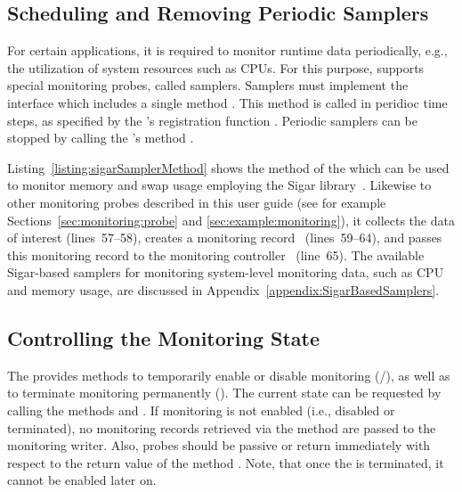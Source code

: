 \subsection{Scheduling and Removing Periodic Samplers}\label{sec:componentsMonitoring:monitoringController:periodicSamplers}

For certain applications, it is required to monitor runtime data periodically, %
e.g., the utilization of system resources such as CPUs. %
For this purpose, \Kieker{} supports special monitoring probes, called samplers. %
Samplers must implement the interface  which includes a %
single method . %
This method is called in peridioc time steps, %
as specified by the 's registration function %
. Periodic samplers can be stopped by %
calling the 's method .

Listing~\ref{listing:sigarSamplerMethod} shows the  method %
of the  which can be used to monitor memory %
and swap usage employing the Sigar library~\cite{HypericSigarWebsite}. %
Likewise to other monitoring probes described in this user guide (see for %
example Sections~\ref{sec:monitoring:probe} and \ref{sec:example:monitoring}), 
it collects the data of interest (lines~57--58), creates a monitoring record~%
(lines~59--64), and passes this monitoring record to the monitoring controller~%
(line~65). %
The available Sigar-based samplers for monitoring system-level monitoring %
data, such as CPU and memory usage, are discussed in Appendix~\ref{appendix:SigarBasedSamplers}. %

\pagebreak

\setJavaCodeListing


\subsection{Controlling the Monitoring State}\label{sec:componentsMonitoring:monitoringController:controState}

The  provides methods to temporarily enable or disable monitoring %
(/), as well as to terminate monitoring %
permanently (). %
The current state can be requested by calling the methods  %
and . If monitoring is not enabled (i.e., disabled %
or terminated), no monitoring records retrieved via the method  %
are passed to the monitoring writer. Also, probes should be passive or return immediately %
with respect to the return value of the method . %
Note, that once the  is terminated, it cannot be enabled %
later on. 

